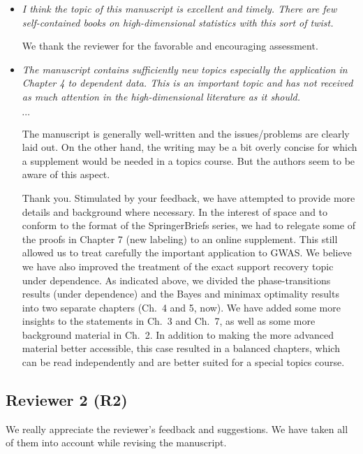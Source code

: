 \documentclass[11pt]{article}
\begin{document}
 \begin{itemize}
  \item {\em I think the topic of this manuscript is excellent and timely. There are few self-contained books on high-dimensional statistics with this sort of twist.}
  
  We thank the reviewer for the favorable and encouraging assessment.  
  
  \item {\em  The manuscript contains sufficiently new topics especially the application in Chapter 4 to dependent data. This is an important topic and has not received as much attention in the high-dimensional literature as it should.
  
  \centerline{$\cdots$}
  
  The manuscript is generally well-written and the issues/problems are clearly laid out. On the other hand, the writing may be a bit overly concise for which a supplement would be needed in a topics course. But the authors seem to be aware of this aspect.}
  
  Thank you.  Stimulated by your feedback, we have attempted to provide more details and background where necessary.  In the interest of space and to 
  conform to the format of the SpringerBriefs series, we had to relegate some of the proofs in Chapter 7 (new labeling) to an online supplement.  This still 
  allowed us to treat carefully the important application to GWAS.  We believe we have also improved the treatment of the exact support recovery topic under 
  dependence.  As indicated above, we divided the phase-transitions results (under dependence) and the Bayes and minimax optimality results into 
  two separate chapters (Ch.\ 4 and 5, now).   We have added some more insights to the statements in Ch.\ 3 and Ch.\ 7, as well as some more 
  background material in Ch.\ 2.  In addition to making the more advanced material better accessible, this case resulted in a balanced chapters, which can be
  read independently and are better suited for a special topics course.
 
  \end{itemize}
  
  \subsection{Reviewer 2 (R2)}
  
  We really appreciate the reviewer's feedback and suggestions.   We have taken all of them into account while revising the manuscript. 
  
\end{document}
